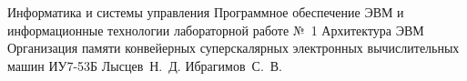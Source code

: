 \documentclass{bmstu}
\begin{document}
\makereporttitle
{Информатика и системы управления} %
{Программное обеспечение ЭВМ и информационные технологии} %
{лабораторной работе №~1} %
{Архитектура ЭВМ} %
{Организация памяти конвейерных суперскалярных электронных вычислительных машин} %
{} %
{ИУ7-53Б} %
{Лысцев~Н.~Д.} %
{Ибрагимов~С.~В.} 

\maketableofcontents


%


% 
\end{document}
